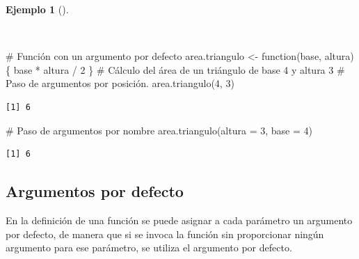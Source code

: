 \documentclass[
  a4paper,
]{scrreport}
\newenvironment{Shaded}{\begin{snugshade}}{\end{snugshade}}
\newcommand{\AttributeTok}[1]{\textcolor[rgb]{0.40,0.45,0.13}{#1}}
\newcommand{\CommentTok}[1]{\textcolor[rgb]{0.37,0.37,0.37}{#1}}
\newcommand{\ControlFlowTok}[1]{\textcolor[rgb]{0.00,0.23,0.31}{#1}}
\newcommand{\DecValTok}[1]{\textcolor[rgb]{0.68,0.00,0.00}{#1}}
\newcommand{\FunctionTok}[1]{\textcolor[rgb]{0.28,0.35,0.67}{#1}}
\newcommand{\NormalTok}[1]{\textcolor[rgb]{0.00,0.23,0.31}{#1}}
\newcommand{\OtherTok}[1]{\textcolor[rgb]{0.00,0.23,0.31}{#1}}
\newcommand{\SpecialCharTok}[1]{\textcolor[rgb]{0.37,0.37,0.37}{#1}}
\theoremstyle{definition}
\theoremstyle{definition}
\newtheorem{example}{Ejemplo}[chapter]
\theoremstyle{remark}
\begin{document}
\begin{example}[]\protect\hypertarget{exm-paso-parametros-funcion}{}\label{exm-paso-parametros-funcion}

~

\begin{Shaded}
\begin{Highlighting}[]
\CommentTok{\# Función con un argumento por defecto}
\NormalTok{area.triangulo }\OtherTok{\textless{}{-}} \ControlFlowTok{function}\NormalTok{(base, altura) \{}
\NormalTok{  base }\SpecialCharTok{*}\NormalTok{ altura }\SpecialCharTok{/} \DecValTok{2}
\NormalTok{\}}
\CommentTok{\# Cálculo del área de un triángulo de base 4 y altura 3}
\CommentTok{\# Paso de argumentos por posición. }
\FunctionTok{area.triangulo}\NormalTok{(}\DecValTok{4}\NormalTok{, }\DecValTok{3}\NormalTok{)}
\end{Highlighting}
\end{Shaded}

\begin{verbatim}
[1] 6
\end{verbatim}

\begin{Shaded}
\begin{Highlighting}[]
\CommentTok{\# Paso de argumentos por nombre}
\FunctionTok{area.triangulo}\NormalTok{(}\AttributeTok{altura =} \DecValTok{3}\NormalTok{, }\AttributeTok{base =} \DecValTok{4}\NormalTok{)}
\end{Highlighting}
\end{Shaded}

\begin{verbatim}
[1] 6
\end{verbatim}

\end{example}

\hypertarget{argumentos-por-defecto}{%
\subsection{Argumentos por defecto}\label{argumentos-por-defecto}}

En la definición de una función se puede asignar a cada parámetro un
argumento por defecto, de manera que si se invoca la función sin
proporcionar ningún argumento para ese parámetro, se utiliza el
argumento por defecto.
\end{document}

